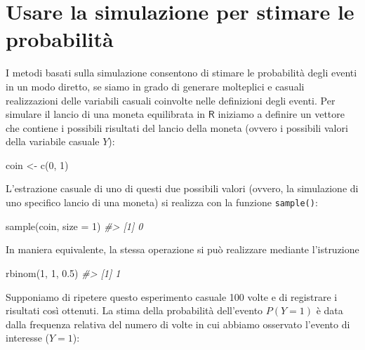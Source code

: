 \documentclass[
  11pt,
]{krantz}
\makeatletter
\newenvironment{Shaded}{\begin{snugshade}}{\end{snugshade}}
\newcommand{\AttributeTok}[1]{\textcolor[rgb]{0.61,0.61,0.61}{#1}}
\newcommand{\CommentTok}[1]{\textcolor[rgb]{0.37,0.37,0.37}{\textit{#1}}}
\newcommand{\DecValTok}[1]{\textcolor[rgb]{0.06,0.06,0.06}{#1}}
\newcommand{\FloatTok}[1]{\textcolor[rgb]{0.06,0.06,0.06}{#1}}
\newcommand{\FunctionTok}[1]{\textcolor[rgb]{0,0,0}{#1}}
\newcommand{\NormalTok}[1]{#1}
\newcommand{\OtherTok}[1]{\textcolor[rgb]{0.37,0.37,0.37}{#1}}
\newenvironment{kframe}{%
\medskip{}
\setlength{\fboxsep}{.8em}
 \def\at@end@of@kframe{}%
 \ifinner\ifhmode%
  \def\at@end@of@kframe{\end{minipage}}%
  \begin{minipage}{\columnwidth}%
 \fi\fi%
 \def\FrameCommand##1{\hskip\@totalleftmargin \hskip-\fboxsep
 \colorbox{shadecolor}{##1}\hskip-\fboxsep
     \hskip-\linewidth \hskip-\@totalleftmargin \hskip\columnwidth}%
 \MakeFramed {\advance\hsize-\width
   \@totalleftmargin\z@ \linewidth\hsize
   \@setminipage}}%
 {\par\unskip\endMakeFramed%
 \at@end@of@kframe}
\renewenvironment{Shaded}{\begin{kframe}}{\end{kframe}}
\newcommand{\R}{\textsf{R}} %
\theoremstyle{definition}
\theoremstyle{definition}
\theoremstyle{definition}
\theoremstyle{definition}
\theoremstyle{remark}
\makeatother
\begin{document}
\hypertarget{usare-la-simulazione-per-stimare-le-probabilituxe0}{%
\section{Usare la simulazione per stimare le probabilità}\label{usare-la-simulazione-per-stimare-le-probabilituxe0}}

I metodi basati sulla simulazione consentono di stimare le probabilità degli eventi in un modo diretto, se siamo in grado di generare molteplici e casuali realizzazioni delle variabili casuali coinvolte nelle definizioni degli eventi. Per simulare il lancio di una moneta equilibrata in \(\R\) iniziamo a definire un vettore che contiene i possibili risultati del lancio della moneta (ovvero i possibili valori della variabile casuale \(Y\)):

\begin{Shaded}
\begin{Highlighting}[]
\NormalTok{coin }\OtherTok{\textless{}{-}} \FunctionTok{c}\NormalTok{(}\DecValTok{0}\NormalTok{, }\DecValTok{1}\NormalTok{)}
\end{Highlighting}
\end{Shaded}

\noindent L'estrazione casuale di uno di questi due possibili valori (ovvero, la simulazione di uno specifico lancio di una moneta) si realizza con la funzione \texttt{sample()}:

\begin{Shaded}
\begin{Highlighting}[]
\FunctionTok{sample}\NormalTok{(coin, }\AttributeTok{size =} \DecValTok{1}\NormalTok{)}
\CommentTok{\#\textgreater{} [1] 0}
\end{Highlighting}
\end{Shaded}

\noindent In maniera equivalente, la stessa operazione si può realizzare mediante l'istruzione

\begin{Shaded}
\begin{Highlighting}[]
\FunctionTok{rbinom}\NormalTok{(}\DecValTok{1}\NormalTok{, }\DecValTok{1}\NormalTok{, }\FloatTok{0.5}\NormalTok{)}
\CommentTok{\#\textgreater{} [1] 1}
\end{Highlighting}
\end{Shaded}

Supponiamo di ripetere questo esperimento casuale 100 volte e di registrare i risultati così ottenuti. La stima della probabilità dell'evento \(P(Y = 1)\) è data dalla frequenza relativa del numero di volte in cui abbiamo osservato l'evento di interesse (\(Y = 1\)):
\end{document}
